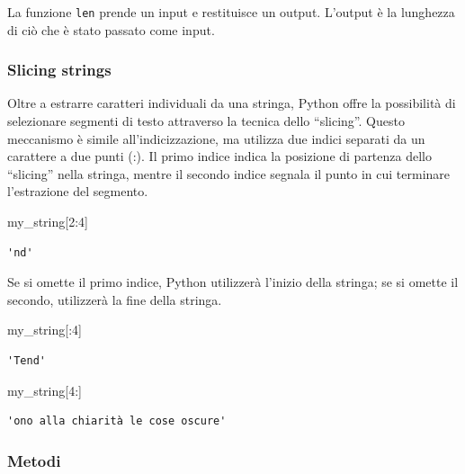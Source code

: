 \documentclass[
  letterpaper,
  krantz2]{{[}./krantz{]}}
\newenvironment{Shaded}{\begin{snugshade}}{\end{snugshade}}
\newcommand{\DecValTok}[1]{\textcolor[rgb]{0.68,0.00,0.00}{#1}}
\newcommand{\NormalTok}[1]{\textcolor[rgb]{0.00,0.23,0.31}{#1}}
\begin{document}
La funzione \texttt{len} prende un input e restituisce un output.
L'output è la lunghezza di ciò che è stato passato come input.

\subsubsection{Slicing strings}\label{slicing-strings}

Oltre a estrarre caratteri individuali da una stringa, Python offre la
possibilità di selezionare segmenti di testo attraverso la tecnica dello
``slicing''. Questo meccanismo è simile all'indicizzazione, ma utilizza
due indici separati da un carattere a due punti (:). Il primo indice
indica la posizione di partenza dello ``slicing'' nella stringa, mentre
il secondo indice segnala il punto in cui terminare l'estrazione del
segmento.

\begin{Shaded}
\begin{Highlighting}[]
\NormalTok{my\_string[}\DecValTok{2}\NormalTok{:}\DecValTok{4}\NormalTok{]}
\end{Highlighting}
\end{Shaded}

\begin{verbatim}
'nd'
\end{verbatim}

Se si omette il primo indice, Python utilizzerà l'inizio della stringa;
se si omette il secondo, utilizzerà la fine della stringa.

\begin{Shaded}
\begin{Highlighting}[]
\NormalTok{my\_string[:}\DecValTok{4}\NormalTok{]}
\end{Highlighting}
\end{Shaded}

\begin{verbatim}
'Tend'
\end{verbatim}

\begin{Shaded}
\begin{Highlighting}[]
\NormalTok{my\_string[}\DecValTok{4}\NormalTok{:]}
\end{Highlighting}
\end{Shaded}

\begin{verbatim}
'ono alla chiarità le cose oscure'
\end{verbatim}

\subsubsection{Metodi}\label{metodi}
\end{document}
